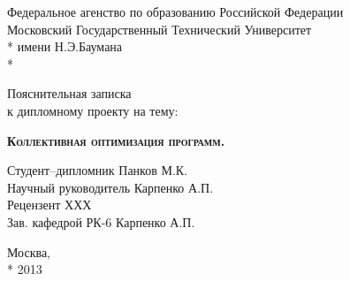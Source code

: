 \begin{titlepage}
    \newpage
    
    \begin{center}
        Федеральное агенство по образованию Российской Федерации \\
        Московский Государственный Технический Университет \\*
        имени Н.Э.Баумана \\*
        \vspace{-12mm}
        \begin{figure}[h]
        \end{figure}
        \vspace{-16mm}
        \hrulefill
    \end{center}
    \begin{center}
        \Large Пояснительная записка \\ к дипломному проекту на тему:
    \end{center}
    
    \vspace{2.5em}
    
    \begin{center}
        \textsc{\textbf{Коллективная оптимизация программ.}}
    \end{center}
    
    \vspace{6em}
    
    \begin{flushleft}
        Студент--дипломник \hrulefill Панков М.К. \\
        \vspace{1.5em}
        Научный руководитель \hrulefill Карпенко А.П.\\
        \vspace{1.5em}
        Рецензент \hrulefill ХХХ\\
        \vspace{1.5em}
        Зав. кафедрой РК-6 \hrulefill Карпенко А.П.
    \end{flushleft}
    
    \vspace{\fill}
    
    \begin{center}
        Москва, \\*
        2013
    \end{center}

\end{titlepage}